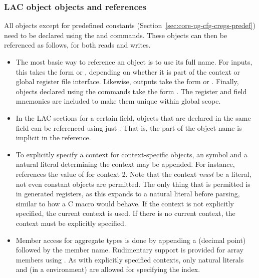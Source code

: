 
\subsubsection{LAC object objects and references}
\label{sec:core-ug-cfg-cregs-refs}

All objects except for predefined constants
(Section~\ref{sec:core-ug-cfg-cregs-predef}) need to be declared using the
\code{\iface*} and \code{\decl*} commands. These objects can then be referenced
as follows, for both reads and writes.

\begin{itemize}

\item The most basic way to reference an object is to use its full name. For 
inputs, this takes the form  or 
, depending on whether it is part of the context or 
global register file interface. Likewise, outputs take the form 
 or . Finally, objects
declared using the \code{\decl*} commands take the form
. The register and field
mnemonics are included to make them unique within global scope.

\item In the LAC sections for a certain field, objects that are declared in the
same field can be referenced using just . That is, the
 part of the object name is
implicit in the reference.

\item To explicitly specify a context for context-specific objects, an  
symbol and a natural literal determining the context may be appended. For 
instance,  references the value of  for context 2. Note 
that the context \emph{must} be a literal, not even constant objects are 
permitted. The only thing that is permitted is \code{\n{}} in generated 
registers, as this expands to a natural literal before parsing, similar to how a 
C macro would behave. If the context is not explicitly specified, the current 
context is used. If there is no current context, the context must be explicitly 
specified.

\item Member access for aggregate types is done by appending a  (decimal 
point) followed by the member name. Rudimentary support is provided for array 
members using . As with explicitly specified contexts, only 
natural literals and \code{\n{}} (in a \code{\registergen} environment) are 
allowed for specifying the index.


\end{itemize}
